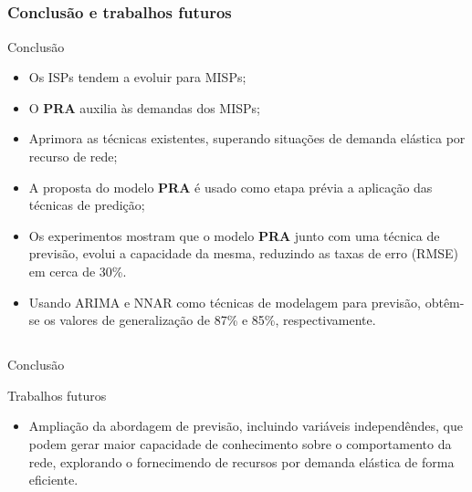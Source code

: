 \documentclass[aspectratio=169]{beamer}
\begin{document}

\subsection{}
\begin{frame}
\frametitle{Conclusão e trabalhos futuros}
\small
\begin{block}{Conclusão}
\begin{itemize} \small
\item Os ISPs tendem a evoluir para MISPs;
\item O \textbf{PRA} auxilia às demandas dos MISPs;
\item Aprimora as técnicas existentes, superando situações de demanda elástica por recurso de rede;
\item A proposta do modelo \textbf{PRA} é usado como etapa prévia a aplicação das técnicas de predição;
\item Os experimentos mostram que o modelo \textbf{PRA} junto com uma técnica de previsão, evolui a capacidade da mesma, reduzindo as taxas de erro (RMSE) em cerca de 30\%.
\item Usando ARIMA e NNAR como técnicas de modelagem para previsão, obtêm-se os
valores de generalização de 87\% e 85\%, respectivamente.
\end{itemize}
\end{block}

\end{frame}

\subsection{}
\begin{frame}{Conclusão}
    \begin{block}{Trabalhos futuros}
    \begin{itemize}[square]
        \item   Ampliação da abordagem de previsão, incluindo variáveis independêndes, que podem gerar maior capacidade de conhecimento sobre o comportamento da rede, explorando o fornecimendo de recursos por demanda elástica de forma eficiente.
    \end{itemize}
  

\end{block}
\end{frame}
\end{document}
